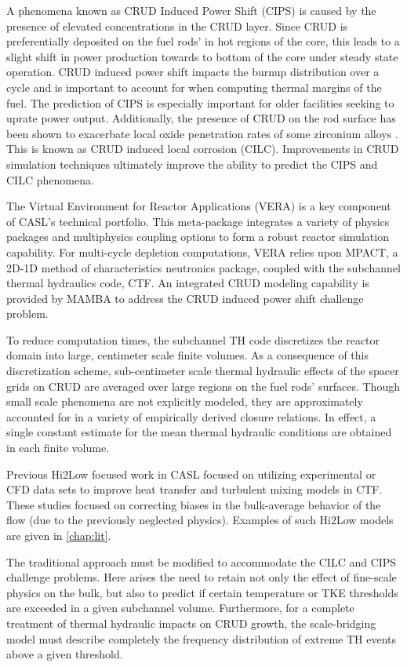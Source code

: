 A phenomena known as CRUD Induced Power Shift (CIPS) is caused by the presence
of elevated  concentrations in the CRUD layer.  Since CRUD is preferentially
deposited on the fuel rods' in hot regions of the core, this leads to a slight shift in
power production towards to bottom of the core under steady state operation.  
CRUD induced power shift impacts the burnup distribution over a cycle
and is important to account for when computing thermal
margins of the fuel.  The prediction
of CIPS is especially important for older facilities seeking to uprate power
output.  Additionally, the presence of CRUD on the rod surface has been shown
to exacerbate local oxide penetration rates of some zirconium alloys \cite{adamson07}.
This is known as CRUD induced local corrosion (CILC).  Improvements in CRUD
simulation techniques ultimately improve the ability to predict the CIPS and
CILC phenomena.

The Virtual Environment for Reactor Applications (VERA) is a key component of
CASL's technical portfolio.  This meta-package integrates a variety of physics
packages and multiphysics coupling options to form a robust reactor simulation
capability.  For multi-cycle depletion computations, VERA relies upon MPACT, a
2D-1D method of characteristics neutronics package, coupled with the subchannel
thermal hydraulics code, CTF.  An integrated CRUD modeling capability
is provided by MAMBA to address the CRUD induced power shift challenge problem.

To reduce computation times, the subchannel TH code discretizes the reactor
domain into large, centimeter scale finite volumes. As a consequence of this
discretization scheme, sub-centimeter scale thermal hydraulic effects of the
spacer grids on CRUD are averaged over large regions on the fuel rods'
surfaces.  Though small scale phenomena are not explicitly modeled, they are
approximately accounted for in a variety of empirically derived closure
relations.  In effect, a single constant estimate for the mean thermal
hydraulic conditions are obtained in each finite volume.

Previous Hi2Low focused work in CASL focused on utilizing experimental or CFD
data sets to improve heat transfer and turbulent mixing models in CTF.  These studies focused on
correcting biases in the bulk-average behavior of the flow (due to the
previously neglected physics).  Examples of such Hi2Low models are given in
\autoref{chap:lit}.

The traditional approach must be modified to accommodate the CILC and CIPS
challenge problems.  Here arises the need to retain not only the effect of
fine-scale physics on the bulk, but also to predict if certain temperature or
TKE thresholds are exceeded in a given subchannel volume.  Furthermore, for a
complete treatment of thermal hydraulic impacts on CRUD growth, the
scale-bridging model must describe completely the frequency distribution of
extreme TH events above a given threshold.


